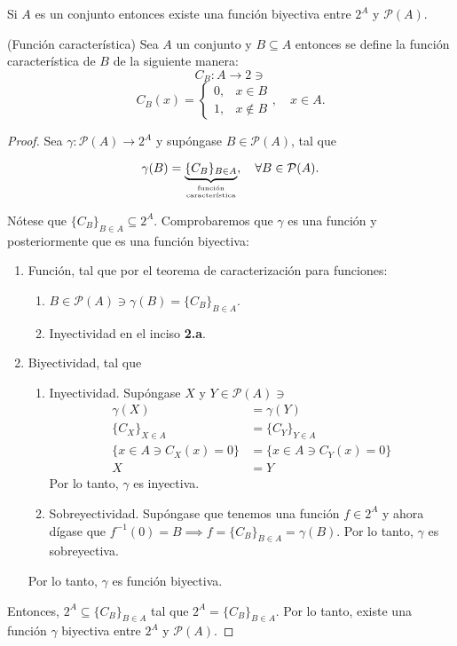 






\begin{problema}
	Si $A$ es un conjunto entonces existe una función biyectiva entre $2^A$ y $\mathcal{P}(A)$. 
\end{problema}
\begin{cajita}
	\begin{definicion}(Función característica)
		Sea $A$ un conjunto  y $B\subseteq A$ entonces se define la función característica de $B$ de la siguiente manera: 
		$$C_B:A\to 2\ni $$
		$$C_B(x)=\begin{cases}
			0, & x \in B\\
			1, & x \not\in B
		\end{cases}, \quad x\in A.$$
	\end{definicion}
\end{cajita}

\begin{proof}
Sea $\gamma: \mathcal{P}(A)\to 2^A$ y supóngase $B\in \mathcal{P}(A)$,  tal que

 $$\gamma(B)=\underbrace{\{C_B\}_{B\in A}}_{\text{función}\atop \text{característica}}, \quad \forall B\in \mathcal{P}(A).$$


 Nótese que $\{C_B\}_{B\in A}  \subseteq 2^A$. Comprobaremos que $\gamma$ es una función y posteriormente que es una función biyectiva:
\begin{enumerate}
	\item Función, tal que por el teorema de caracterización para funciones: \begin{enumerate}
		\item $B\in \mathcal{P}(A) \ni \gamma(B)=\{C_B\}_{B\in A}$. 
		\item Inyectividad en el inciso \textbf{2.a}. 
	\end{enumerate}
	\item Biyectividad, tal que 
	\begin{enumerate}
		\item Inyectividad. Supóngase $X$ y $Y\in \mathcal{P}(A)\ni$
		\begin{align*}
			 \gamma (X) &=\gamma(Y)\\
			 \{C_X\}_{X\in A}&=\{C_Y\}_{Y\in A}\\
			 \{x\in A\ni C_X(x)=0\} &=\{x\in A\ni C_Y(x)=0\}\\
			 X&=Y
		\end{align*}
	Por lo tanto, $\gamma$ es inyectiva. 
		\item Sobreyectividad. Supóngase que tenemos una función $f\in 2^A$ y ahora dígase que $f^{-1}(0)=B\implies f=\{C_B\}_{B\in A}=\gamma(B)$. Por lo tanto, $\gamma$ es sobreyectiva. 
	\end{enumerate}
Por lo tanto, $\gamma$ es función biyectiva. 
\end{enumerate}	
Entonces, $2^A \subseteq \{C_B\}_{B\in A} $ tal que $2^A = \{C_B\}_{B\in A} $. Por lo tanto, existe una función $\gamma$ biyectiva entre $2^A$ y $\mathcal{P}(A)$. 
\end{proof}






